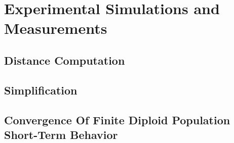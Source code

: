 \chapter{Experimental Simulations and Measurements} \label{ch:experiments}

\section{Distance Computation}
\section{Simplification}
\section{Convergence Of Finite Diploid Population Short-Term Behavior}



